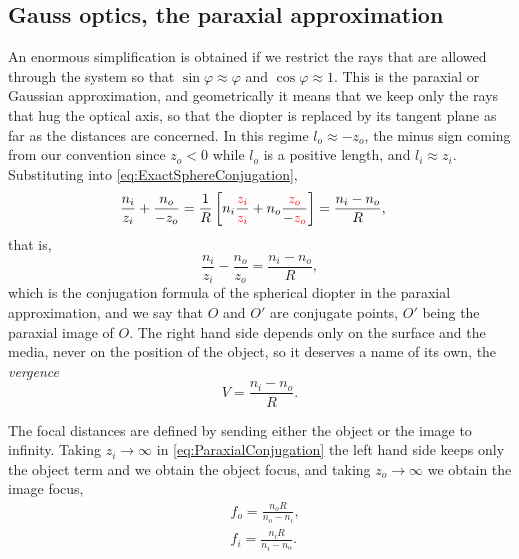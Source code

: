             \subsection{Gauss optics, the paraxial approximation}

                An enormous simplification is obtained if we restrict the rays that are allowed through the system so that $\sin\varphi\approx\varphi$ and $\cos\varphi\approx1$. This is the paraxial or Gaussian approximation, and geometrically it means that we keep only the rays that hug the optical axis, so that the diopter is replaced by its tangent plane as far as the distances are concerned. In this regime $l_o\approx-z_o$, the minus sign coming from our convention since $z_o<0$ while $l_o$ is a positive length, and $l_i\approx z_i$. Substituting into \ref{eq:ExactSphereConjugation},
                \begin{align*}
                    & \frac{n_i}{z_i} + \frac{n_o}{-z_o} = \frac{1}{R}\left[ n_i\frac{ {\color{red}z_i}}{ {\color{red}z_i}} + n_o\frac{ {\color{red}z_o}}{-{\color{red}z_o}} \right] = \frac{n_i-n_o}{R},
                \end{align*}
                that is,
                \begin{equation}\label{eq:ParaxialConjugation}
                    \frac{n_i}{z_i} - \frac{n_o}{z_o} = \frac{n_i-n_o}{R},
                \end{equation}
                which is the conjugation formula of the spherical diopter in the paraxial approximation, and we say that $O$ and $O'$ are conjugate points, $O'$ being the paraxial image of $O$. The right hand side depends only on the surface and the media, never on the position of the object, so it deserves a name of its own, the \emph{vergence}
                \begin{equation}\label{eq:Vergence}
                    V = \frac{n_i-n_o}{R}.
                \end{equation}

                The focal distances are defined by sending either the object or the image to infinity. Taking $z_i\to\infty$ in \ref{eq:ParaxialConjugation} the left hand side keeps only the object term and we obtain the object focus, and taking $z_o\to\infty$ we obtain the image focus,
                \begin{align}
                    & f_o = \frac{n_oR}{n_o-n_i},\label{eq:ObjectFocus}\\
                    & f_i = \frac{n_iR}{n_i-n_o}.\label{eq:ImageFocus}
                \end{align}

